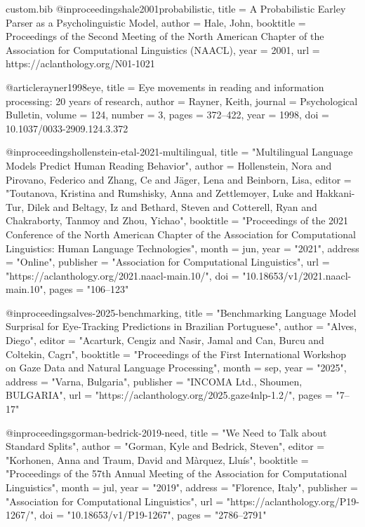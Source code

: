 \begin{filecontents*}[overwrite]{custom.bib}
@inproceedings{hale2001probabilistic,
  title        = {A Probabilistic {Earley} Parser as a Psycholinguistic Model},
  author       = {Hale, John},
  booktitle    = {Proceedings of the Second Meeting of the North American Chapter of the Association for Computational Linguistics (NAACL)},
  year         = {2001},
  url          = {https://aclanthology.org/N01-1021}
}

@article{rayner1998eye,
  title        = {Eye movements in reading and information processing: 20 years of research},
  author       = {Rayner, Keith},
  journal      = {Psychological Bulletin},
  volume       = {124},
  number       = {3},
  pages        = {372--422},
  year         = {1998},
  doi          = {10.1037/0033-2909.124.3.372}
}

@inproceedings{hollenstein-etal-2021-multilingual,
    title = "Multilingual Language Models Predict Human Reading Behavior",
    author = {Hollenstein, Nora  and
      Pirovano, Federico  and
      Zhang, Ce  and
      J{\"a}ger, Lena  and
      Beinborn, Lisa},
    editor = "Toutanova, Kristina  and
      Rumshisky, Anna  and
      Zettlemoyer, Luke  and
      Hakkani-Tur, Dilek  and
      Beltagy, Iz  and
      Bethard, Steven  and
      Cotterell, Ryan  and
      Chakraborty, Tanmoy  and
      Zhou, Yichao",
    booktitle = "Proceedings of the 2021 Conference of the North American Chapter of the Association for Computational Linguistics: Human Language Technologies",
    month = jun,
    year = "2021",
    address = "Online",
    publisher = "Association for Computational Linguistics",
    url = "https://aclanthology.org/2021.naacl-main.10/",
    doi = "10.18653/v1/2021.naacl-main.10",
    pages = "106--123"
}

@inproceedings{alves-2025-benchmarking,
    title = "Benchmarking Language Model Surprisal for Eye-Tracking Predictions in {B}razilian {P}ortuguese",
    author = "Alves, Diego",
    editor = "Acarturk, Cengiz  and
      Nasir, Jamal  and
      Can, Burcu  and
      Coltekin, Cagr{\i}",
    booktitle = "Proceedings of the First International Workshop on Gaze Data and Natural Language Processing",
    month = sep,
    year = "2025",
    address = "Varna, Bulgaria",
    publisher = "INCOMA Ltd., Shoumen, BULGARIA",
    url = "https://aclanthology.org/2025.gaze4nlp-1.2/",
    pages = "7--17"
}

@inproceedings{gorman-bedrick-2019-need,
    title = "We Need to Talk about Standard Splits",
    author = "Gorman, Kyle  and
      Bedrick, Steven",
    editor = "Korhonen, Anna  and
      Traum, David  and
      M{\`a}rquez, Llu{\'i}s",
    booktitle = "Proceedings of the 57th Annual Meeting of the Association for Computational Linguistics",
    month = jul,
    year = "2019",
    address = "Florence, Italy",
    publisher = "Association for Computational Linguistics",
    url = "https://aclanthology.org/P19-1267/",
    doi = "10.18653/v1/P19-1267",
    pages = "2786--2791"
}



\end{filecontents*}

